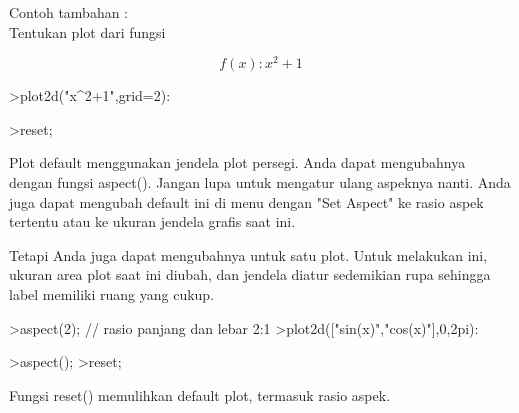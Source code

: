 \documentclass[12pt,arial,letterpaper]{book}
\begin{document}
\begin{eulercomment}
\begin{eulercomment}
\begin{eulercomment}
\begin{eulercomment}
\begin{eulercomment}
\begin{eulercomment}
\begin{eulercomment}
\begin{eulercomment}
\begin{eulercomment}
\begin{eulercomment}
\begin{eulercomment}
\begin{eulercomment}
\begin{eulercomment}
\begin{eulercomment}
\begin{eulercomment}
Contoh tambahan :\\
Tentukan plot dari fungsi\\
\end{eulercomment}
\begin{eulerformula}
\[
f(x):x^2+1
\]
\end{eulerformula}
\begin{eulerprompt}
>plot2d("x^2+1",grid=2):
\end{eulerprompt}
\begin{eulerprompt}
>reset;
\end{eulerprompt}
\begin{eulercomment}
Plot default menggunakan jendela plot persegi. Anda dapat mengubahnya
dengan fungsi aspect(). Jangan lupa untuk mengatur ulang aspeknya
nanti. Anda juga dapat mengubah default ini di menu dengan "Set
Aspect" ke rasio aspek tertentu atau ke ukuran jendela grafis saat
ini.

Tetapi Anda juga dapat mengubahnya untuk satu plot. Untuk melakukan
ini, ukuran area plot saat ini diubah, dan jendela diatur sedemikian
rupa sehingga label memiliki ruang yang cukup.
\end{eulercomment}
\begin{eulerprompt}
>aspect(2); // rasio panjang dan lebar 2:1
>plot2d(["sin(x)","cos(x)"],0,2pi):
\end{eulerprompt}
\begin{eulerprompt}
>aspect();
>reset;
\end{eulerprompt}
\begin{eulercomment}
Fungsi reset() memulihkan default plot, termasuk rasio aspek.


\end{eulercomment}
\end{eulercomment}
\end{eulercomment}
\end{eulercomment}
\end{eulercomment}
\end{eulercomment}
\end{eulercomment}
\end{eulercomment}
\end{eulercomment}
\end{eulercomment}
\end{eulercomment}
\end{eulercomment}
\end{eulercomment}
\end{eulercomment}
\end{eulercomment}
\end{document}
